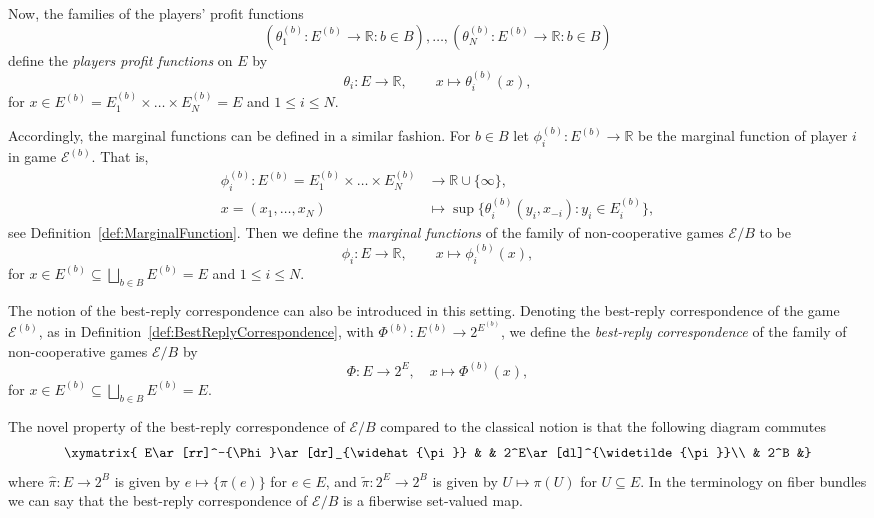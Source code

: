 \documentclass[a4paper,11pt,reqno,english]{amsart}
\theoremstyle{plain}
\theoremstyle{definition}
\newcommand\R{\mathbb{R}}
\newcommand{\Ecal}{\mathcal{E}}
\begin{document}
\medskip
Now, the families of the players' profit functions
\[
	(\theta_1^{(b)}\colon E^{(b)}\longrightarrow\R : b\in B),\dots, (\theta_N^{(b)}\colon E^{(b)}\longrightarrow\R : b\in B)
\]
define the {\em players profit functions} on $E$ by
\begin{displaymath}
	\theta_i \colon E \longrightarrow   \mathbb{R}, \qquad x \longmapsto  \theta_i^{(b)} (x),
\end{displaymath}
for $x\in E^{(b)}=E_1^{(b)}\times\dots\times E_N^{(b)}  = E$ and $1\leq i\leq N$.

\medskip
Accordingly, the marginal functions can be defined in a similar fashion.
For $b\in B$ let $\phi_i^{(b)} \colon E^{(b)}\longrightarrow\mathbb{R}$ be the marginal function of player $i$ in game $\Ecal^{(b)}$.
That is,
\begin{align*}
	\phi_i^{(b)}\colon E^{(b)} = E_1^{(b)}\times\dots\times E_N^{(b)} & \longrightarrow \mathbb{R}\cup\{\infty\}  ,                        \\
	x = (x_1,\dots,x_N)                                               & \longmapsto \sup\{\theta_i^{(b)}(y_i,x_{-i}) : y_i\in E_i^{(b)}\},
\end{align*}
see Definition~\ref{def:MarginalFunction}.
Then we define the {\em marginal functions} of the family of non-cooperative games $\Ecal/B$ to be
\begin{displaymath}
	\phi_i \colon E \longrightarrow   \mathbb{R}, \qquad x \longmapsto  \phi_i^{(b)} (x),
\end{displaymath}
for $x\in E^{(b)} \subseteq \bigsqcup_{b\in B}E^{(b)} = E$ and $1\leq i\leq N$.

\medskip
The notion of the best-reply correspondence can also be introduced in this setting.
Denoting the best-reply correspondence of the game $\Ecal^{(b)}$, as in Definition~\ref{def:BestReplyCorrespondence}, with $\Phi^{(b)} \colon E^{(b)}\longrightarrow 2^{E^{(b)}}$, we define the {\em best-reply correspondence} of the family of non-cooperative games $\Ecal/B$ by
\begin{equation}\label{eq:def_best_reply_familes}
	\Phi \colon E \longrightarrow 2^{E}, \quad x \longmapsto \Phi^{(b)} (x),
\end{equation}
for $x\in E^{(b)} \subseteq \bigsqcup_{b\in B}E^{(b)} = E$.


\medskip
The novel property of the best-reply correspondence of $\Ecal/B$ compared to the classical notion is that the following diagram commutes
\begin{equation}\label{eq:commutative_diagram}
	\xymatrix{
	E\ar[rr]^-{\Phi}\ar[dr]_{\widehat{\pi}} & & 2^E\ar[dl]^{\widetilde{\pi}}\\
	& 2^B &}
\end{equation}
where $\widehat{\pi}\colon E\longrightarrow 2^B$ is given by $e\longmapsto\{\pi(e)\}$ for $e\in E$, and $\widetilde{\pi}\colon 2^E\longrightarrow 2^B$ is given by $U\longmapsto \pi(U)$ for $U\subseteq E$.
In the terminology on fiber bundles we can say that the best-reply correspondence of $\Ecal/B$ is a fiberwise set-valued map.
\end{document}
